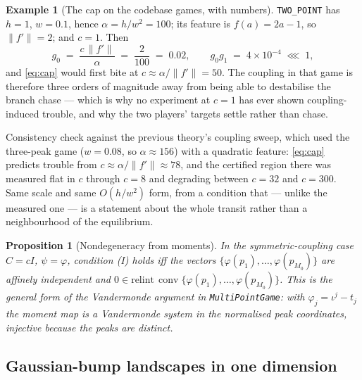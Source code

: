 \documentclass[11pt]{article}
\newtheorem{proposition}{Proposition}
\theoremstyle{definition}
\newtheorem{example}{Example}
\DeclareMathOperator{\conv}{conv}
\begin{document}
\begin{example}[The cap on the codebase games, with numbers]\label{ex:cap}
\texttt{TWO\_POINT} has $h = 1$, $w = 0.1$, hence $\alpha = h/w^2 = 100$; its
feature is $f(a) = 2a - 1$, so $\|f'\| = 2$; and $c = 1$. Then
\[
  g_0 \;=\; \frac{c\,\|f'\|}{\alpha} \;=\; \frac{2}{100} \;=\; 0.02,
  \qquad
  g_0 g_1 \;=\; 4 \times 10^{-4} \;\lll\; 1 ,
\]
and \eqref{eq:cap} would first bite at $c \approx \alpha/\|f'\| = 50$. The
coupling in that game is therefore three orders of magnitude away from being able
to destabilise the branch chase --- which is why no experiment at $c = 1$ has ever
shown coupling-induced trouble, and why the two players' targets settle rather
than chase.

Consistency check against the previous theory's coupling sweep, which used the
three-peak game ($w = 0.08$, so $\alpha \approx 156$) with a quadratic feature:
\eqref{eq:cap} predicts trouble from $c \approx \alpha/\|f'\| \approx 78$, and the
certified region there was measured flat in $c$ through $c = 8$ and degrading
between $c = 32$ and $c = 300$. Same scale and same $O(h/w^2)$ form, from a
condition that --- unlike the measured one --- is a statement about the whole
transit rather than a neighbourhood of the equilibrium.
\end{example}

\begin{proposition}[Nondegeneracy from moments]\label{prop:moments}
In the symmetric-coupling case $C = cI$, $\psi = \varphi$, condition (I) holds
iff the vectors $\{\varphi(p_1),\dots,\varphi(p_{M_0})\}$ are affinely
independent and
$0 \in \mathrm{relint}\,\conv\{\varphi(p_1),\dots,\varphi(p_{M_0})\}$. This is the
general form of the Vandermonde argument in \texttt{MultiPointGame}: with
$\varphi_j = \iota^j - t_j$ the moment map is a Vandermonde system in the
normalised peak coordinates, injective because the peaks are distinct.
\end{proposition}

\subsection{Gaussian-bump landscapes in one dimension}
\end{document}
